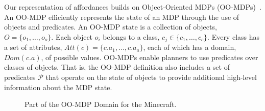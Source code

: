 \documentclass[letterpaper]{article}
\begin{document}
Our representation of affordances builds on Object-Oriented MDPs
(OO-MDPs)~\citep{diuk08}.  An OO-MDP efficiently represents the state
of an MDP through the use of objects and predicates.  An OO-MDP state
is a collection of objects, $O = \{o_1, \ldots, o_o \}$.  Each object
$o_i$ belongs to a class, $c_j \in \{c_1, \ldots, c_c\}$. Every class
has a set of attributes, $Att(c) = \{c.a_1, \ldots, c.a_a \}$, each of
which has a domain, $Dom(c.a)$, of possible values. OO-MDPs enable
planners to use predicates over classes of objects. That is, the
OO-MDP definition also includes a set of predicates $\mathcal{P}$ that
operate on the state of objects to provide additional high-level
information about the MDP state.


\begin{figure}
%
\caption{Part of the OO-MDP Domain for the Minecraft.\label{fig:oomdp}}
\end{figure}
\end{document}
